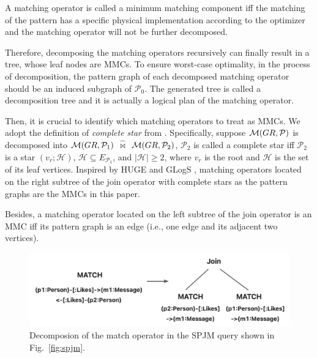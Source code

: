 \begin{definition}
    A matching operator is called a minimum matching component iff the matching of the pattern has a specific physical implementation according to the optimizer and the matching operator will not be further decomposed.
\end{definition} 

Therefore, decomposing the matching operators recursively can finally result in a tree, whose leaf nodes are MMCs.
To ensure worst-case optimality, in the process of decomposition, the pattern graph of each decomposed matching operator should be an induced subgraph of $\mathcal{P}_0$.
The generated tree is called a decomposition tree and it is actually a logical plan of the matching operator.

Then, it is crucial to identify which matching operators to treat as MMCs.
We adopt the definition of \emph{complete star} from \cite{huge}.
Specifically, suppose $\mathcal{M}(GR, \mathcal{P})$ is decomposed into $\mathcal{M}(GR, \mathcal{P}_1)$ $\widehat{\Join}$ $\mathcal{M}(GR, \mathcal{P}_2)$, $\mathcal{P}_2$ is called a complete star iff $\mathcal{P}_2$ is a star $(v_r; \mathcal{H})$, $\mathcal{H} \subseteq E_{\mathcal{P}_1}$, and $|\mathcal{H}| \geq 2$, where $v_r$ is the root and $\mathcal{H}$ is the set of its leaf vertices.
Inspired by HUGE \cite{huge} and GLogS \cite{GLogS}, matching operators located on the right subtree of the join operator with complete stars as the pattern graphs are the MMCs in this paper.

Besides, a matching operator located on the left subtree of the join operator is an MMC iff its pattern graph is an edge (i.e., one edge and its adjacent two vertices).

\begin{figure}
    \centering
    \includegraphics[width=.8\linewidth]{./figures/match-decompose.png}
    \caption{Decomposion of the match operator in the SPJM query shown in Fig.~\ref{fig:spjm}.}
    \label{fig:match-decomposition}
\end{figure}

